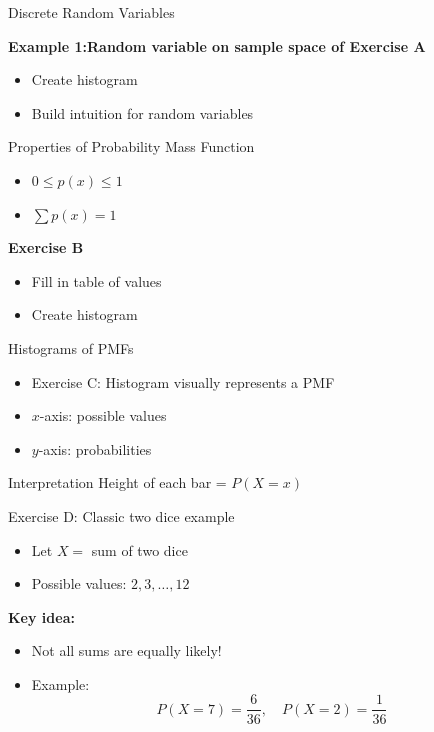 \documentclass[dvipsnames]{beamer}
\begin{document}
\begin{frame}{Discrete Random Variables}

\textbf{Example 1:Random variable on sample space of Exercise A}
\begin{itemize}
    \item Create histogram
    \item Build intuition for random variables
\end{itemize}
\end{frame}


\begin{frame}{Properties of Probability Mass Function}

\begin{itemize}
    \item $0 \le p(x) \le 1$
    \item $\sum p(x) = 1$
\end{itemize}

\textbf{Exercise B}
\begin{itemize}
    \item Fill in table of values
    \item Create histogram
\end{itemize}
\end{frame}




\begin{frame}{Histograms of PMFs}
\begin{itemize}
    \item Exercise C: Histogram visually represents a PMF
    \item $x$-axis: possible values
    \item $y$-axis: probabilities
\end{itemize}



\begin{block}{Interpretation}
Height of each bar = $P(X = x)$
\end{block}
\end{frame}


\begin{frame}{Exercise D: Classic two dice example}
\begin{itemize}
    \item Let $X =$ sum of two dice
    \item Possible values: $2,3,\dots,12$
\end{itemize}

\textbf{Key idea:}
\begin{itemize}
    \item Not all sums are equally likely!
    \item Example:
    \[
    P(X=7) = \frac{6}{36}, \quad P(X=2)=\frac{1}{36}
    \]
\end{itemize}
\end{frame}
\end{document}
